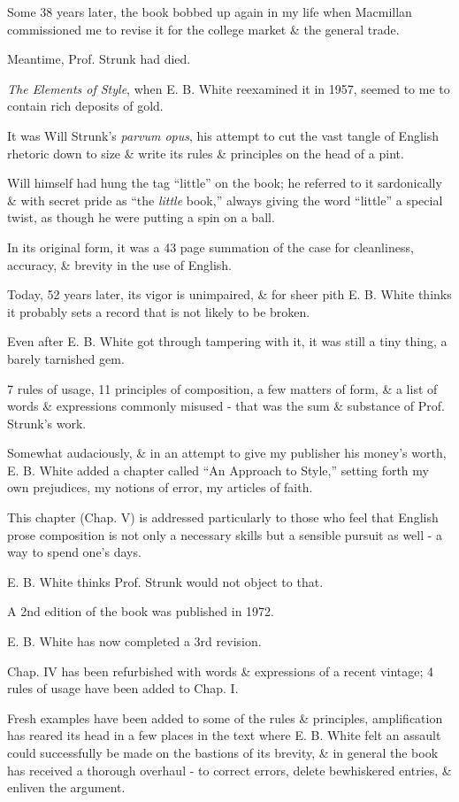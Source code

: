 \documentclass{article}
\begin{document}
Some 38 years later, the book bobbed up again in my life when Macmillan commissioned me to revise it for the college market \& the general trade.

Meantime, Prof. Strunk had died.

%
{\it The Elements of Style}, when E. B. White reexamined it in 1957, seemed to me to contain rich deposits of gold.

It was Will Strunk's {\it parvum opus}, his attempt to cut the vast tangle of English rhetoric down to size \& write its rules \& principles on the head of a pint.

Will himself had hung the tag ``little'' on the book; he referred to it sardonically \& with secret pride as ``the {\it little} book,'' always giving the word ``little'' a special twist, as though he were putting a spin on a ball.

In its original form, it was a 43 page summation of the case for cleanliness, accuracy, \& brevity in the use of English.

Today, 52 years later, its vigor is unimpaired, \& for sheer pith E. B. White thinks it probably sets a record that is not likely to be broken.

Even after E. B. White got through tampering with it, it was still a tiny thing, a barely tarnished gem.

7 rules of usage, 11 principles of composition, a few matters of form, \& a list of words \& expressions commonly misused - that was the sum \& substance of Prof. Strunk's work.

Somewhat audaciously, \& in an attempt to give my publisher his money's worth, E. B. White added a chapter called ``An Approach to Style,'' setting forth my own prejudices, my notions of error, my articles of faith.

This chapter (Chap. V) is addressed particularly to those who feel that English prose composition is not only a necessary skills but a sensible pursuit as well - a way to spend one's days.

E. B. White thinks Prof. Strunk would not object to that.

%
A 2nd edition of the book was published in 1972.

E. B. White has now completed a 3rd revision.

Chap. IV has been refurbished with words \& expressions of a recent vintage; 4 rules of usage have been added to Chap. I.

Fresh examples have been added to some of the rules \& principles, amplification has reared its head in a few places in the text where E. B. White felt an assault could successfully be made on the bastions of its brevity, \& in general the book has received a thorough overhaul - to correct errors, delete bewhiskered entries, \& enliven the argument.
\end{document}
